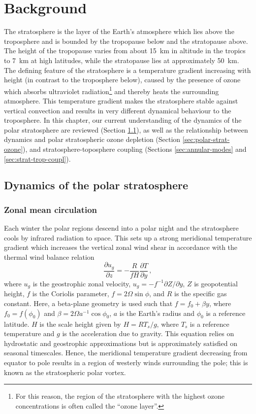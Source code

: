 \chapter{Background}
\label{cha:background}


The stratosphere is the layer of the Earth's atmosphere which lies above the
troposphere and is bounded by the tropopause below and the stratopause
above. The height of the tropopause varies from about 15~km in altitude in the
tropics to 7~km at high latitudes, while the stratopause lies at approximately
50~km. The defining feature of the stratosphere is a temperature gradient
increasing with height (in contrast to the troposphere below), caused by the
presence of ozone which absorbs ultraviolet radiation\footnote{For this reason,
  the region of the stratosphere with the highest ozone concentrations is often
  called the ``ozone layer''.}  and thereby heats the surrounding
atmosphere. This temperature gradient makes the stratosphere stable against
vertical convection and results in very different dynamical behaviour to the
troposphere. In this chapter, our current understanding of the dynamics of the
polar stratosphere are reviewed (Section \ref{sec:dynam-polar-strat}), as well
as the relationship between dynamics and polar stratospheric ozone depletion
(Section \ref{sec:polar-strat-ozone}), and stratosphere-toposphere coupling
(Sections \ref{sec:annular-modes} and \ref{sec:strat-trop-coupl}).

\section{Dynamics of the polar stratosphere}
\label{sec:dynam-polar-strat}


\subsection{Zonal mean circulation}

Each winter the polar regions descend into a polar night and the stratosphere
cools by infrared radiation to space. This sets up a strong meridional
temperature gradient which increases the vertical zonal wind shear in accordance
with the thermal wind balance relation
\begin{equation}
\frac{\partial u_g}{\partial z} = -\frac{R}{fH}\frac{\partial T}{\partial y} \,, 
\end{equation} 
where $u_g$ is the geostrophic zonal velocity,
$u_g = -f^{-1}\partial Z/\partial y$, $Z$ is geopotential height, $f$ is the
Coriolis parameter, $f=2\Omega\sin\phi$, and $R$ is the specific gas
constant. Here, a beta-plane geometry is used such that $f=f_0+\beta y$, where
$f_0=f(\phi_0)$ and $\beta = 2\Omega a^{-1}\cos\phi_0$, $a$ is the Earth's
radius and $\phi_{0}$ is a reference latitude. $H$ is the scale height given by
$H = RT_s/g$, where $T_s$ is a reference temperature and $g$ is the acceleration
due to gravity. This equation relies on hydrostatic and geostrophic
approximations but is approximately satisfied on seasonal timescales. Hence, the
meridional temperature gradient decreasing from equator to pole results in a
region of westerly winds surrounding the pole; this is known as the
stratospheric polar vortex.

